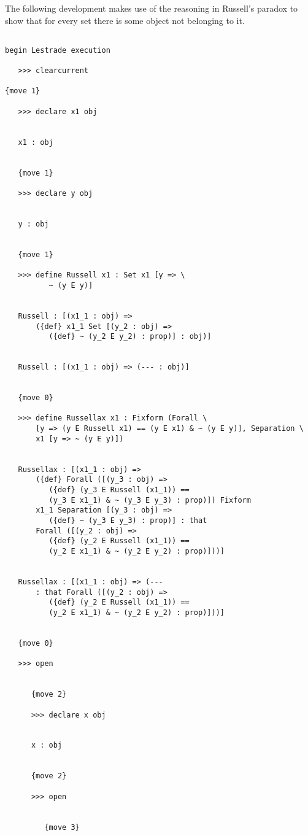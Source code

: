 \documentclass[12pt]{article}
\begin{document}

The following development makes use of the reasoning in Russell's paradox to show that for every set there is some object not belonging to it.

\begin{verbatim}

begin Lestrade execution

   >>> clearcurrent

{move 1}

   >>> declare x1 obj


   x1 : obj


   {move 1}

   >>> declare y obj


   y : obj


   {move 1}

   >>> define Russell x1 : Set x1 [y => \
          ~ (y E y)]


   Russell : [(x1_1 : obj) => 
       ({def} x1_1 Set [(y_2 : obj) => 
          ({def} ~ (y_2 E y_2) : prop)] : obj)]


   Russell : [(x1_1 : obj) => (--- : obj)]


   {move 0}

   >>> define Russellax x1 : Fixform (Forall \
       [y => (y E Russell x1) == (y E x1) & ~ (y E y)], Separation \
       x1 [y => ~ (y E y)])


   Russellax : [(x1_1 : obj) => 
       ({def} Forall ([(y_3 : obj) => 
          ({def} (y_3 E Russell (x1_1)) == 
          (y_3 E x1_1) & ~ (y_3 E y_3) : prop)]) Fixform 
       x1_1 Separation [(y_3 : obj) => 
          ({def} ~ (y_3 E y_3) : prop)] : that 
       Forall ([(y_2 : obj) => 
          ({def} (y_2 E Russell (x1_1)) == 
          (y_2 E x1_1) & ~ (y_2 E y_2) : prop)]))]


   Russellax : [(x1_1 : obj) => (--- 
       : that Forall ([(y_2 : obj) => 
          ({def} (y_2 E Russell (x1_1)) == 
          (y_2 E x1_1) & ~ (y_2 E y_2) : prop)]))]


   {move 0}

   >>> open


      {move 2}

      >>> declare x obj


      x : obj


      {move 2}

      >>> open


         {move 3}


\end{verbatim}
\end{document}
